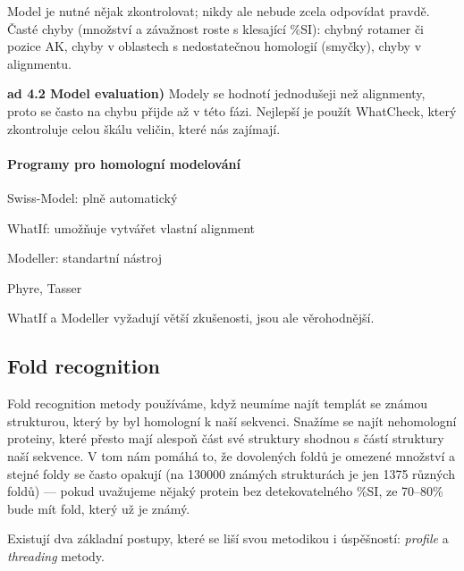 \documentclass[DIV=8]{scrreprt}
\begin{document}
Model je nutné nějak zkontrolovat; nikdy ale nebude zcela odpovídat pravdě. Časté chyby (množství a závažnost roste s klesající \%SI):  chybný rotamer či pozice AK, chyby v oblastech s nedostatečnou homologií (smyčky), chyby v alignmentu.

\textbf{ad 4.2 Model evaluation)} Modely se hodnotí jednodušeji než alignmenty, proto se často na chybu přijde až v této fázi. Nejlepší je použít WhatCheck, který zkontroluje celou škálu veličin, které nás zajímají.

\paragraph{Programy pro homologní modelování}
\begin{myItemize}[nosep]
    \item Swiss-Model: plně automatický
    \item WhatIf: umožňuje vytvářet vlastní alignment
    \item Modeller: standartní nástroj
    \item Phyre, Tasser
\end{myItemize}



WhatIf a Modeller vyžadují větší zkušenosti, jsou ale věrohodnější.

\subsection{Fold recognition} \label{Fold recognition}


Fold recognition metody používáme, když neumíme najít templát se známou strukturou, který by byl homologní k naší sekvenci. Snažíme se najít nehomologní proteiny, které přesto mají alespoň část své struktury shodnou s částí struktury naší sekvence. V tom nám pomáhá to, že dovolených foldů je omezené množství a stejné foldy se často opakují (na 130000 známých strukturách je jen 1375 různých foldů) --- pokud uvažujeme nějaký protein bez detekovatelného \%SI, ze 70--80\% bude mít fold, který už je známý.

Existují dva základní postupy, které se liší svou metodikou i úspěšností: \emph{profile} a \emph{threading} metody.
\end{document}
